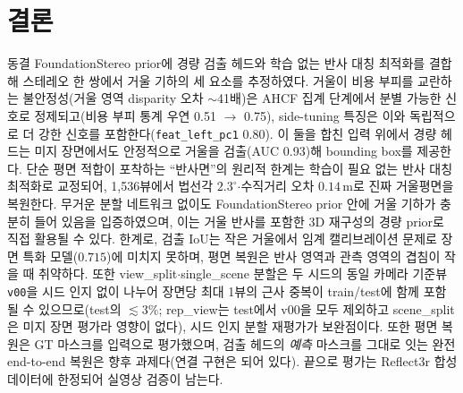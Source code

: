 \documentclass[10pt,a4paper]{article}
\begin{document}
\section{결론}
동결 FoundationStereo prior에 경량 검출 헤드와 학습 없는 반사 대칭 최적화를 결합해 스테레오 한 쌍에서 거울 기하의 세 요소를 추정하였다. 거울이 비용 부피를 교란하는 불안정성(거울 영역 disparity 오차 $\sim$41배)은 AHCF 집계 단계에서 분별 가능한 신호로 정제되고(비용 부피 통계 우연 0.51 $\to$ 0.75), side-tuning 특징은 이와 독립적으로 더 강한 신호를 포함한다(\texttt{feat\_left\_pc1} 0.80). 이 둘을 합친 입력 위에서 경량 헤드는 미지 장면에서도 안정적으로 거울을 검출(AUC 0.93)해 bounding box를 제공한다. 단순 평면 적합이 포착하는 ``반사면''의 원리적 한계는 학습이 필요 없는 반사 대칭 최적화로 교정되어, 1{,}536뷰에서 법선각 $2.3^\circ$$\cdot$수직거리 오차 $0.14$\,m로 진짜 거울평면을 복원한다. 무거운 분할 네트워크 없이도 FoundationStereo prior 안에 거울 기하가 충분히 들어 있음을 입증하였으며, 이는 거울 반사를 포함한 3D 재구성의 경량 prior로 직접 활용될 수 있다. 한계로, 검출 IoU는 작은 거울에서 임계 캘리브레이션 문제로 장면 특화 모델($0.715$)에 미치지 못하며, 평면 복원은 반사 영역과 관측 영역의 겹침이 작을 때 취약하다. 또한 view\_split$\cdot$single\_scene 분할은 두 시드의 동일 카메라 기준뷰 \texttt{v00}을 시드 인지 없이 나누어 장면당 최대 1뷰의 근사 중복이 train/test에 함께 포함될 수 있으므로(test의 $\lesssim3\%$; rep\_view는 test에서 v00을 모두 제외하고 scene\_split은 미지 장면 평가라 영향이 없다), 시드 인지 분할 재평가가 보완점이다. 또한 평면 복원은 GT 마스크를 입력으로 평가했으며, 검출 헤드의 \emph{예측} 마스크를 그대로 잇는 완전 end-to-end 복원은 향후 과제다(연결 구현은 되어 있다). 끝으로 평가는 Reflect3r 합성 데이터에 한정되어 실영상 검증이 남는다.



\end{document}
